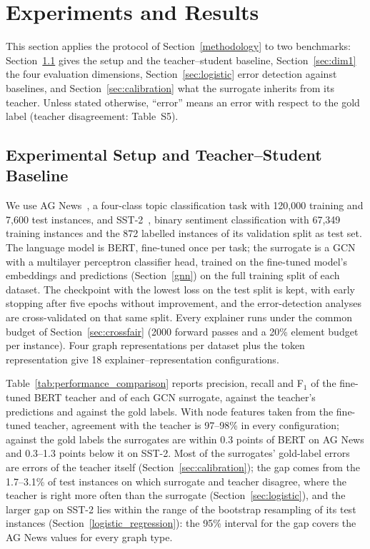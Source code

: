 \documentclass[preprint, times, review, 10pt]{elsarticle}
\begin{document}
\section{Experiments and Results} \label{discussion}

This section applies the protocol of Section~\ref{methodology} to two benchmarks: Section~\ref{configuration} gives the setup and the teacher--student baseline, Section~\ref{sec:dim1} the four evaluation dimensions, Section~\ref{sec:logistic} error detection against baselines, and Section~\ref{sec:calibration} what the surrogate inherits from its teacher. Unless stated otherwise, ``error'' means an error with respect to the gold label (teacher disagreement: Table~S5).

\subsection{Experimental Setup and Teacher--Student Baseline} \label{configuration} \label{sec:llm_teacher}

We use AG News~\cite{10.5555/2969239.2969312}, a four-class topic classification task with 120,000 training and 7,600 test instances, and SST-2~\cite{socher-etal-2013-recursive}, binary sentiment classification with 67,349 training instances and the 872 labelled instances of its validation split as test set. The language model is BERT, fine-tuned once per task; the surrogate is a GCN with a multilayer perceptron classifier head, trained on the fine-tuned model's embeddings and predictions (Section~\ref{gnn}) on the full training split of each dataset. The checkpoint with the lowest loss on the test split is kept, with early stopping after five epochs without improvement, and the error-detection analyses are cross-validated on that same split. Every explainer runs under the common budget of Section~\ref{sec:crossfair} (2000 forward passes and a 20\% element budget per instance). Four graph representations per dataset plus the token representation give 18 explainer--representation configurations.



Table~\ref{tab:performance_comparison} reports precision, recall and F\(_1\) of the fine-tuned BERT teacher and of each GCN surrogate, against the teacher's predictions and against the gold labels. With node features taken from the fine-tuned teacher, agreement with the teacher is 97--98\% in every configuration; against the gold labels the surrogates are within 0.3 points of BERT on AG News and 0.3--1.3 points below it on SST-2. Most of the surrogates' gold-label errors are errors of the teacher itself (Section~\ref{sec:calibration}); the gap comes from the 1.7--3.1\% of test instances on which surrogate and teacher disagree, where the teacher is right more often than the surrogate (Section~\ref{sec:logistic}), and the larger gap on SST-2 lies within the range of the bootstrap resampling of its test instances (Section~\ref{logistic_regression}): the 95\% interval for the gap covers the AG News values for every graph type.
\end{document}
